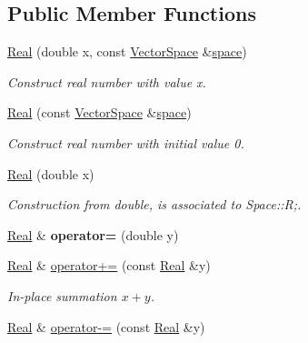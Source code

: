 \subsection*{Public Member Functions}
\begin{DoxyCompactItemize}
\item 
\hyperlink{classSpacy_1_1Real_a7c8581cf79ac0d3ffdc31179d31d8e30}{Real} (double x, const \hyperlink{classSpacy_1_1VectorSpace}{Vector\-Space} \&\hyperlink{classSpacy_1_1VectorBase_aa999dbf9d679d895dfe04c10fbf9f5e9}{space})
\begin{DoxyCompactList}\small\item\em Construct real number with value x. \end{DoxyCompactList}\item 
\hyperlink{classSpacy_1_1Real_a5ae2b93ceddb594b142b3706e4cc9c83}{Real} (const \hyperlink{classSpacy_1_1VectorSpace}{Vector\-Space} \&\hyperlink{classSpacy_1_1VectorBase_aa999dbf9d679d895dfe04c10fbf9f5e9}{space})
\begin{DoxyCompactList}\small\item\em Construct real number with initial value 0. \end{DoxyCompactList}\item 
\hypertarget{classSpacy_1_1Real_ad0f157978475b3c9942a1bcdceb41ab0}{\hyperlink{classSpacy_1_1Real_ad0f157978475b3c9942a1bcdceb41ab0}{Real} (double x)}\label{classSpacy_1_1Real_ad0f157978475b3c9942a1bcdceb41ab0}

\begin{DoxyCompactList}\small\item\em Construction from double, is associated to Space\-::\-R;. \end{DoxyCompactList}\item 
\hypertarget{classSpacy_1_1Real_a2c90e84d6c6732b6812d371b7ccf3a18}{\hyperlink{classSpacy_1_1Real}{Real} \& {\bfseries operator=} (double y)}\label{classSpacy_1_1Real_a2c90e84d6c6732b6812d371b7ccf3a18}

\item 
\hypertarget{classSpacy_1_1Real_afe343ccee93f82b75d214c389baee9be}{\hyperlink{classSpacy_1_1Real}{Real} \& \hyperlink{classSpacy_1_1Real_afe343ccee93f82b75d214c389baee9be}{operator+=} (const \hyperlink{classSpacy_1_1Real}{Real} \&y)}\label{classSpacy_1_1Real_afe343ccee93f82b75d214c389baee9be}

\begin{DoxyCompactList}\small\item\em In-\/place summation $x+y$. \end{DoxyCompactList}\item 
\hypertarget{classSpacy_1_1Real_a6af6b5e8aeeaa16be7acc6cdb6b0a9a4}{\hyperlink{classSpacy_1_1Real}{Real} \& \hyperlink{classSpacy_1_1Real_a6af6b5e8aeeaa16be7acc6cdb6b0a9a4}{operator-\/=} (const \hyperlink{classSpacy_1_1Real}{Real} \&y)}\label{classSpacy_1_1Real_a6af6b5e8aeeaa16be7acc6cdb6b0a9a4}


\end{DoxyCompactItemize}
